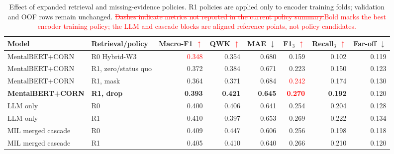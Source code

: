 \documentclass{article}
\DeclareRobustCommand{\rev}[1]{\textcolor{red}{#1}}
\DeclareRobustCommand{\del}[1]{\textcolor{red}{\sout{#1}}}
\newcommand{\best}[1]{\textbf{#1}}
\begin{document}
\begin{table}[t]
  \caption{Effect of expanded retrieval and missing-evidence policies. R1 policies are applied only to encoder training folds; validation and OOF rows remain unchanged. \del{Dashes indicate metrics not reported in the current policy summary.}\rev{Bold marks the best encoder training policy; the LLM and cascade blocks are aligned reference points, not policy candidates.}}
  \label{tab:evidence}
  \centering
  \scriptsize
  \begin{tabular}{llrrrrrr}
    \toprule
    Model & Retrieval/policy & Macro-F1\rev{ $\uparrow$} & QWK\rev{ $\uparrow$} & MAE $\downarrow$ & F1$_3$\rev{ $\uparrow$} & Recall$_3$\rev{ $\uparrow$} & Far-off $\downarrow$ \\
    \midrule
    MentalBERT+CORN & R0 Hybrid-W3 & \rev{0.348} & 0.354 & 0.680 & 0.159 & 0.102 & 0.119 \\
    MentalBERT+CORN & R1, zero/status quo & 0.372 & 0.384 & 0.671 & 0.223 & 0.150 & 0.123 \\
    MentalBERT+CORN & R1, mask & 0.364 & 0.371 & 0.684 & \rev{0.242} & 0.174 & 0.130 \\
    \best{MentalBERT+CORN} & \best{R1, drop} & \best{0.393} & \best{0.421} & \best{0.645} & \rev{\textbf{0.270}} & \best{0.192} & 0.120 \\
    \midrule
    LLM only & R0 & 0.400 & 0.406 & 0.641 & 0.254 & 0.204 & 0.128 \\
    LLM only & R1 & 0.410 & 0.397 & 0.653 & 0.269 & 0.222 & 0.134 \\
    MIL merged cascade & R0 & 0.409 & 0.447 & 0.606 & 0.256 & 0.198 & 0.118 \\
    MIL merged cascade & R1 & 0.405 & 0.410 & 0.640 & 0.266 & 0.210 & 0.120 \\
    \bottomrule
  \end{tabular}
\end{table}
\end{document}
